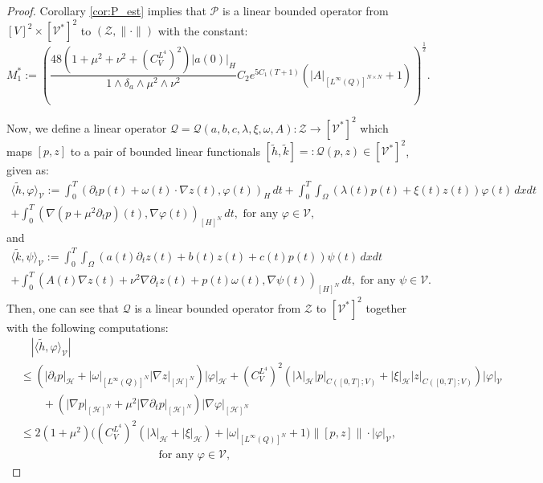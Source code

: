 \documentclass[10pt,a4paper]{amsart}
\def\sH{\mathscr{H}}
\def\sP{\mathscr{P}}
\def\sQ{\mathscr{Q}}
\def\sV{\mathscr{V}}
\def\sZ{\mathscr{Z}}
\begin{document}
\begin{proof}
  Corollary \ref{cor:P_est} implies that $\sP$ is a linear bounded operator from $[V]^2 \times [\sV^*]^2$ to $(\sZ, \| \cdot \|)$ with the constant:
  \begin{equation}
    M_1^* := \left(\frac{48(1 + \mu^2 + \nu^2 + (C_V^{L^4})^2)|a(0)|_H}{1 \wedge \delta_a \wedge \mu^2 \wedge \nu^2} C_2 e^{5 C_1 (T+1)}(|A|_{[L^\infty(Q)]^{N \times N}} + 1)\right)^\frac{1}{2}.
  \end{equation}

  Now, we define a linear operator $\sQ = \sQ(a,b,c,\lambda,\xi,\omega,A): \sZ \longrightarrow [\sV^*]^2$ which maps $[p,z]$ to a pair of bounded linear functionals $[\tilde h, \tilde k] =: \sQ(p,z) \in [\sV^*]^2$, given as:
  \begin{gather}
    \langle \tilde h, \varphi \rangle_\sV := \int_0^T (\partial_t p(t) + \omega(t) \cdot \nabla z(t), \varphi(t))_H \,dt + \int_0^T \int_\Omega (\lambda(t) p(t) + \xi(t)z(t)) \varphi(t) \,dxdt 
    \\
    + \int_0^T (\nabla (p + \mu^2 \partial_t p)(t), \nabla \varphi(t))_{[H]^N} \,dt, \mbox{ for any } \varphi \in \sV,
  \end{gather}
  and
  \begin{gather}
    \langle \tilde k,\psi \rangle_\sV := \int_0^T \int_\Omega (a(t) \partial_t z(t) + b(t) z(t) + c(t) p(t)) \psi(t) \,dxdt 
    \\
    + \int_0^T (A(t) \nabla z(t) + \nu^2\nabla \partial_t z(t) + p(t)\omega(t), \nabla \psi(t))_{[H]^N} \,dt, \mbox{ for any } \psi \in \sV.
  \end{gather}
  Then, one can see that $\sQ$ is a linear bounded operator from $\sZ$ to $[\sV^*]^2$ together with the following computations:
  \begin{align}
    &\quad |\langle \tilde h, \varphi \rangle_\sV| 
    \\
    &\leq (|\partial_t p|_\sH + |\omega|_{[L^\infty(Q)]^N} |\nabla z|_{[\sH]^N})|\varphi|_\sH + (C_V^{L^4})^2(|\lambda|_\sH |p|_{C([0,T];V)} + |\xi|_\sH |z|_{C([0,T];V)}) |\varphi|_\sV
    \\
    &\qquad + (|\nabla p|_{[\sH]^N} + \mu^2 |\nabla \partial_t p|_{[\sH]^N}) |\nabla \varphi|_{[\sH]^N} 
    \\
    &\leq 2 (1 + \mu^2)\bigl( (C_V^{L^4})^2 (|\lambda|_\sH + |\xi|_\sH) + |\omega|_{[L^\infty(Q)]^N} + 1\bigr)\| [p,z] \| \cdot |\varphi|_\sV,
    \\
    &\qquad\qquad\qquad\qquad\qquad\qquad \mbox{ for any } \varphi \in \sV,

\end{align}
\end{proof}
\end{document}

